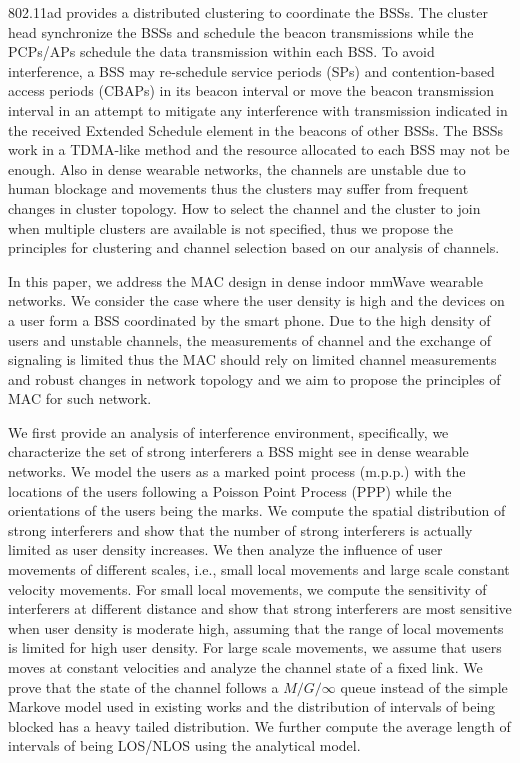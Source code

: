 \documentclass[10pt, conference, letterpaper]{IEEEtran}
\begin{document}
802.11ad provides a distributed clustering to coordinate the BSSs. The cluster head synchronize the BSSs and schedule the beacon transmissions while the PCPs/APs schedule the data transmission within each BSS. To avoid interference, a BSS may re-schedule service periods (SPs) and contention-based access periods (CBAPs) in its beacon interval or move the beacon transmission interval in an attempt to mitigate any interference with transmission indicated in the received Extended Schedule element in the beacons of other BSSs. The BSSs work in a TDMA-like method and the resource allocated to each BSS may not be enough. Also in dense wearable networks, the channels are unstable due to human blockage and movements thus the clusters may suffer from frequent changes in cluster topology. How to select the channel and the cluster to join when multiple clusters are available is not specified, thus we propose the principles for clustering and channel selection based on our analysis of channels.

In this paper, we address the MAC design in dense indoor mmWave wearable networks. We consider the case where the user density is high and the devices on a user form a BSS coordinated by the smart phone. Due to the high density of users and unstable channels, the measurements of channel and the exchange of signaling is limited thus the MAC should rely on limited channel measurements and robust changes in network topology and we aim to propose the principles of MAC for such network.

We first provide an analysis of interference environment, specifically, we characterize the set of strong interferers a BSS might see in dense wearable networks. We model the users as a marked point process (m.p.p.) with the locations of the users following a Poisson Point Process (PPP) while the orientations of the users being the marks. We compute the spatial distribution of strong interferers and show that the number of strong interferers is actually limited as user density increases. 
We then analyze the influence of user movements of different scales, i.e., small local movements and large scale constant velocity movements. For small local movements, we compute the sensitivity of interferers at different distance and show that strong interferers are most sensitive when user density is moderate high, assuming that the range of local movements is limited for high user density. For large scale movements, we assume that users moves at constant velocities and analyze the channel state of a fixed link. We prove that the state of the channel follows a $M/G/\infty$ queue instead of the simple Markove model used in existing works and the distribution of intervals of being blocked has a heavy tailed distribution. We further compute the average length of intervals of being LOS/NLOS using the analytical model.
\end{document}
